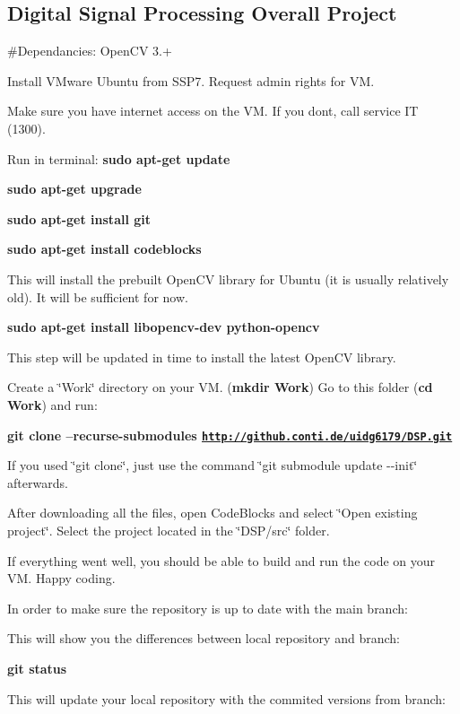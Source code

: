 \subsection*{Digital Signal Processing Overall Project}

\#\+Dependancies\+: Open\+CV 3.+

Install V\+Mware Ubuntu from S\+S\+P7. Request admin rights for VM.

Make sure you have internet access on the VM. If you don\textquotesingle{}t, call service IT (1300).

Run in terminal\+: {\bfseries sudo apt-\/get update}

{\bfseries sudo apt-\/get upgrade}

{\bfseries sudo apt-\/get install git}

{\bfseries sudo apt-\/get install codeblocks}

This will install the prebuilt Open\+CV library for Ubuntu (it is usually relatively old). It will be sufficient for now.

{\bfseries sudo apt-\/get install libopencv-\/dev python-\/opencv}

This step will be updated in time to install the latest Open\+CV library.

Create a \char`\"{}\+Work\char`\"{} directory on your VM. ({\bfseries mkdir Work}) Go to this folder ({\bfseries cd Work}) and run\+:

{\bfseries git clone --recurse-\/submodules \href{http://github.conti.de/uidg6179/DSP.git}{\tt http\+://github.\+conti.\+de/uidg6179/\+D\+S\+P.\+git}}

If you used \char`\"{}git clone\char`\"{}, just use the command \char`\"{}git submodule update -\/-\/init\char`\"{} afterwards.

After downloading all the files, open Code\+Blocks and select \char`\"{}\+Open existing project\char`\"{}. Select the project located in the \char`\"{}\+D\+S\+P/src\char`\"{} folder.

If everything went well, you should be able to build and run the code on your VM. Happy coding.

In order to make sure the repository is up to date with the main branch\+:

This will show you the differences between local repository and branch\+:

{\bfseries git status}

This will update your local repository with the commited versions from branch\+:

